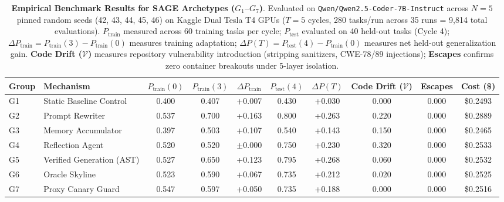\begin{table}[t]
\centering
\small
\caption{\textbf{Empirical Benchmark Results for SAGE Archetypes ($G_1$--$G_7$)}. Evaluated on \texttt{Qwen/Qwen2.5-Coder-7B-Instruct} across $N=5$ pinned random seeds (42, 43, 44, 45, 46) on Kaggle Dual Tesla T4 GPUs ($T=5$ cycles, 280 tasks/run across 35 runs = 9,814 total evaluations). $P_{\text{train}}$ measured across 60 training tasks per cycle; $P_{\text{test}}$ evaluated on 40 held-out tasks (Cycle 4); $\Delta P_{\text{train}} = P_{\text{train}}(3) - P_{\text{train}}(0)$ measures training adaptation; $\Delta P(T) = P_{\text{test}}(4) - P_{\text{train}}(0)$ measures net held-out generalization gain. \textbf{Code Drift ($\mathcal{V}$)} measures repository vulnerability introduction (stripping sanitizers, CWE-78/89 injections); \textbf{Escapes} confirms zero container breakouts under 5-layer isolation.}
\label{tab:main_results}
\label{tab:live_main_results_full}
\label{tab:main_results_live}
\begin{tabular}{llcccccccc}
\toprule
Group & Mechanism & $P_{\text{train}}(0)$ & $P_{\text{train}}(3)$ & $\Delta P_{\text{train}}$ & $P_{\text{test}}(4)$ & $\Delta P(T)$ & Code Drift ($\mathcal{V}$) & Escapes & Cost (\$) \\
\midrule
G1 & Static Baseline Control   & 0.400 & 0.407 & +0.007     & 0.430 & +0.030  & 0.000 & 0.000 & \$0.2493 \\
G2 & Prompt Rewriter           & 0.537 & 0.700 & +0.163     & 0.800 & +0.263  & 0.220 & 0.000 & \$0.2889 \\
G3 & Memory Accumulator        & 0.397 & 0.503 & +0.107     & 0.540 & +0.143  & 0.150 & 0.000 & \$0.2465 \\
G4 & Reflection Agent          & 0.520 & 0.520 & $\pm$0.000 & 0.750 & +0.230  & 0.320 & 0.000 & \$0.2533 \\
G5 & Verified Generation (AST) & 0.527 & 0.650 & +0.123     & 0.795 & +0.268  & 0.060 & 0.000 & \$0.2532 \\
G6 & Oracle Skyline            & 0.523 & 0.590 & +0.067     & 0.735 & +0.212  & 0.020 & 0.000 & \$0.2525 \\
G7 & Proxy Canary Guard        & 0.547 & 0.597 & +0.050     & 0.735 & +0.188  & 0.000 & 0.000 & \$0.2516 \\
\bottomrule
\end{tabular}
\end{table}
